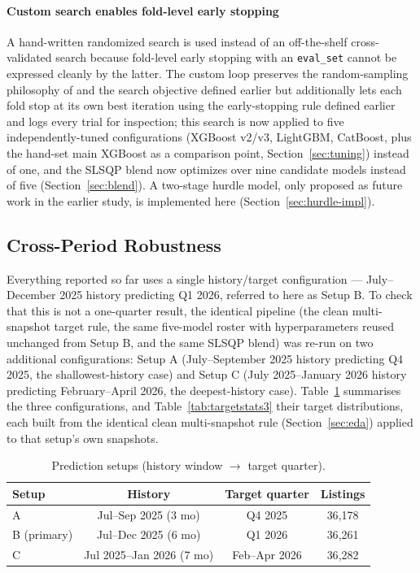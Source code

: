 \documentclass[journal]{IEEEtran}
\begin{document}
\paragraph{Custom search enables fold-level early stopping} A hand-written
randomized search is used instead of an off-the-shelf cross-validated search
because fold-level early stopping with an \texttt{eval\_set} cannot be
expressed cleanly by the latter. The custom loop preserves the random-sampling
philosophy of \cite{bergstra2012random} and the search objective defined
earlier but additionally lets each fold stop at its own best iteration using
the early-stopping rule defined earlier and logs every trial for inspection; this search is now
applied to five independently-tuned configurations (XGBoost v2/v3, LightGBM,
CatBoost, plus the hand-set main XGBoost as a comparison point,
Section~\ref{sec:tuning}) instead of one, and the SLSQP blend now optimizes
over nine candidate models instead of five (Section~\ref{sec:blend}). A
two-stage hurdle model, only proposed as future work in the earlier study, is
implemented here (Section~\ref{sec:hurdle-impl}).

\subsection{Cross-Period Robustness}
\label{sec:robustness}
Everything reported so far uses a single history/target configuration --- July--December
2025 history predicting Q1 2026, referred to here as Setup B. To check that this is not a
one-quarter result, the identical pipeline (the clean multi-snapshot target rule, the same
five-model roster with hyperparameters reused unchanged from Setup B, and the same SLSQP
blend) was re-run on two additional configurations: Setup A (July--September 2025 history
predicting Q4 2025, the shallowest-history case) and Setup C (July 2025--January 2026 history
predicting February--April 2026, the deepest-history case). Table~\ref{tab:setups}
summarises the three configurations, and Table~\ref{tab:targetstats3} their target
distributions, each built from the identical clean multi-snapshot rule
(Section~\ref{sec:eda}) applied to that setup's own snapshots.

\begin{table}[!t]
\caption{Prediction setups (history window $\to$ target quarter).}
\label{tab:setups}
\centering
\begin{tabular}{lccc}
\toprule
Setup & History & Target quarter & Listings \\
\midrule
A & Jul--Sep 2025 (3 mo) & Q4 2025 & 36{,}178 \\
B (primary) & Jul--Dec 2025 (6 mo) & Q1 2026 & 36{,}261 \\
C & Jul 2025--Jan 2026 (7 mo) & Feb--Apr 2026 & 36{,}282 \\
\bottomrule
\end{tabular}
\end{table}
\end{document}
